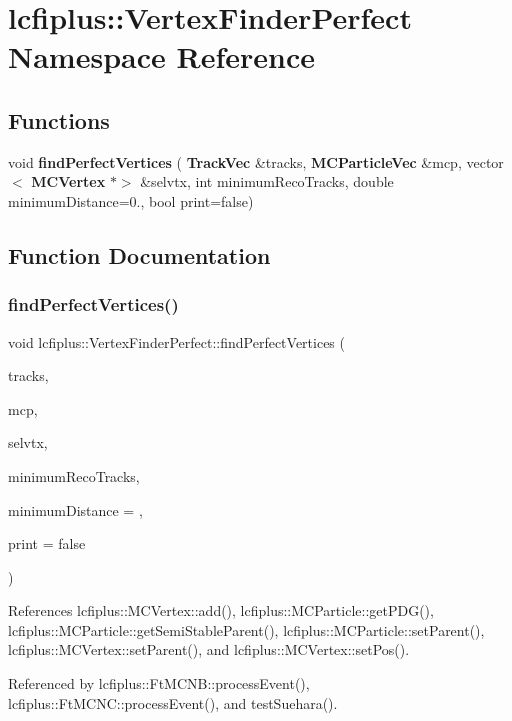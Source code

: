 \section{lcfiplus\+:\+:Vertex\+Finder\+Perfect Namespace Reference}
\label{namespacelcfiplus_1_1VertexFinderPerfect}
\subsection*{Functions}
\begin{DoxyCompactItemize}
\item 
void \textbf{ find\+Perfect\+Vertices} (\textbf{ Track\+Vec} \&tracks, \textbf{ M\+C\+Particle\+Vec} \&mcp, vector$<$ \textbf{ M\+C\+Vertex} $\ast$$>$ \&selvtx, int minimum\+Reco\+Tracks, double minimum\+Distance=0., bool print=false)
\end{DoxyCompactItemize}


\subsection{Function Documentation}
\mbox{\label{namespacelcfiplus_1_1VertexFinderPerfect_afd68460a65fdc716d23f2ef743a33f7d}} 
\subsubsection{find\+Perfect\+Vertices()}
{\footnotesize\ttfamily void lcfiplus\+::\+Vertex\+Finder\+Perfect\+::find\+Perfect\+Vertices (\begin{DoxyParamCaption}\item[{\textbf{ Track\+Vec} \&}]{tracks,  }\item[{\textbf{ M\+C\+Particle\+Vec} \&}]{mcp,  }\item[{vector$<$ \textbf{ M\+C\+Vertex} $\ast$$>$ \&}]{selvtx,  }\item[{int}]{minimum\+Reco\+Tracks,  }\item[{double}]{minimum\+Distance = {},  }\item[{bool}]{print = {\ttfamily false} }\end{DoxyParamCaption})}



References lcfiplus\+::\+M\+C\+Vertex\+::add(), lcfiplus\+::\+M\+C\+Particle\+::get\+P\+D\+G(), lcfiplus\+::\+M\+C\+Particle\+::get\+Semi\+Stable\+Parent(), lcfiplus\+::\+M\+C\+Particle\+::set\+Parent(), lcfiplus\+::\+M\+C\+Vertex\+::set\+Parent(), and lcfiplus\+::\+M\+C\+Vertex\+::set\+Pos().



Referenced by lcfiplus\+::\+Ft\+M\+C\+N\+B\+::process\+Event(), lcfiplus\+::\+Ft\+M\+C\+N\+C\+::process\+Event(), and test\+Suehara().

